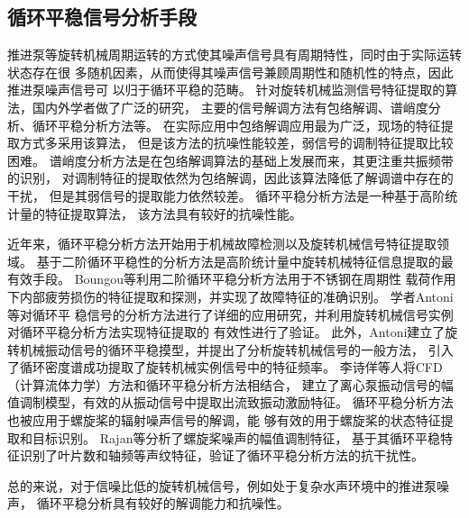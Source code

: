 \subsection{循环平稳信号分析手段}
推进泵等旋转机械周期运转的方式使其噪声信号具有周期特性，同时由于实际运转状态存在很
多随机因素，从而使得其噪声信号兼顾周期性和随机性的特点，因此推进泵噪声信号可
以归于循环平稳的范畴\cite{陈进2013机械故障特征提取的循环平稳理论及方法}。
针对旋转机械监测信号特征提取的算法，国内外学者做了广泛的研究，
主要的信号解调方法有包络解调、谱峭度分析、循环平稳分析方法等\cite{wangSpectralKurtosisFault2016}。
在实际应用中包络解调应用最为广泛，现场的特征提取方式多采用该算法，
但是该方法的抗噪性能较差，弱信号的调制特征提取比较困难\cite{abboudEnvelopeAnalysisRotating2017,2014The}。
谱峭度分析方法是在包络解调算法的基础上发展而来，其更注重共振频带的识别，
对调制特征的提取依然为包络解调，因此该算法降低了解调谱中存在的干扰，
但是其弱信号的提取能力依然较差\cite{2007Fast,2011A}。
循环平稳分析方法是一种基于高阶统计量的特征提取算法，
该方法具有较好的抗噪性能\cite{gardnerCyclostationarityHalfCentury2006,songRobustPassiveUnderwater2019}。

近年来，循环平稳分析方法开始用于机械故障检测以及旋转机械信号特征提取领域\cite{2006Detecting,poirierExtrapolationDynamicLoad2017,fengGearDamageAssessment2011,何俊2007,antoniCyclicSpectralAnalysis2007a,2017Extrapolation}。
基于二阶循环平稳性的分析方法是高阶统计量中旋转机械特征信息提取的最有效手段\cite{antoniUseCyclicPower2005}。
Boungou等\cite{boungouFatigueDamageDetection2015}利用二阶循环平稳分析方法用于不锈钢在周期性
载荷作用下内部疲劳损伤的特征提取和探测，并实现了故障特征的准确识别。
学者Antoni等\cite{antoniCyclostationarityExamples2009}对循环平
稳信号的分析方法进行了详细的应用研究，并利用旋转机械信号实例对循环平稳分析方法实现特征提取的
有效性进行了验证。
此外，Antoni建立了旋转机械振动信号的循环平稳摸型，并提出了分析旋转机械信号的一般方法，
引入了循环密度谱成功提取了旋转机械实例信号中的特征频率\cite{antoniCyclostationaryModellingRotating2004a}。
李诗佯等\cite{2019Cyclostationary}人将CFD（计算流体力学）方法和循环平稳分析方法相结合，
建立了离心泵振动信号的幅值调制模型，有效的从振动信号中提取出流致振动激励特征。
循环平稳分析方法也被应用于螺旋桨的辐射噪声信号的解调，能
够有效的用于螺旋桨的状态特征提取和目标识别\cite{antoniDetectionSurfaceShips2012,2016Cyclostationary}。
Rajan等\cite{rajanCyclostationarityBasedSonar2016}分析了螺旋桨噪声的幅值调制特征，
基于其循环平稳特征识别了叶片数和轴频等声纹特征，验证了循环平稳分析方法的抗干扰性。

总的来说，对于信噪比低的旋转机械信号，例如处于复杂水声环境中的推进泵噪声，
循环平稳分析具有较好的解调能力和抗噪性。

